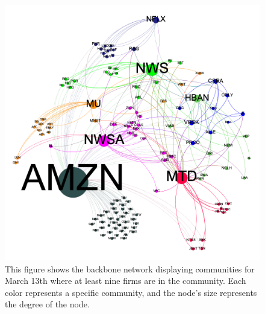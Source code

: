 \begin{figure}[htb!]
  \centerline{\includegraphics[scale=0.5]{figures/EarnAnnounceTE/20180313OnlyC-curved.png}}
  \caption{This figure shows the backbone network displaying communities for March 13th where at least nine firms are in the community.  Each color represents a specific community, and the node's size represents the degree of the node.}
  \label{fig:Community20180313}
\end{figure}



\clearpage

